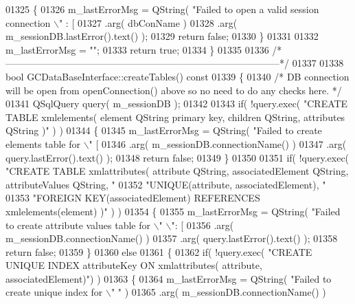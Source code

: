 \begin{DoxyCode}
{{{{{{{{{{{{{{{{{{{{{{{{{{{{{{{{{{{{{{{{{{{{{{{{{{01325   \{
01326     m\_lastErrorMsg = QString( \textcolor{stringliteral}{"Failed to open a valid session connection \(\backslash\)"%
      : [%
01327         .arg( dbConName )
01328         .arg( m\_sessionDB.lastError().text() );
01329     \textcolor{keywordflow}{return} \textcolor{keyword}{false};
01330   \}
01331 
01332   m\_lastErrorMsg = \textcolor{stringliteral}{""};
01333   \textcolor{keywordflow}{return} \textcolor{keyword}{true};
01334 \}
01335 
01336 \textcolor{comment}{/*
      --------------------------------------------------------------------------------------*/}
01337 
01338 \textcolor{keywordtype}{bool} GCDataBaseInterface::createTables()\textcolor{keyword}{ const}
01339 \textcolor{keyword}{}\{
01340   \textcolor{comment}{/* DB connection will be open from openConnection() above so no need to do
       any checks here. */}
01341   QSqlQuery query( m\_sessionDB );
01342 
01343   \textcolor{keywordflow}{if}( !query.exec( \textcolor{stringliteral}{"CREATE TABLE xmlelements( element QString primary key,
       children QString, attributes QString )"} ) )
01344   \{
01345     m\_lastErrorMsg = QString( \textcolor{stringliteral}{"Failed to create elements table for \(\backslash\)"%
       [%
01346         .arg( m\_sessionDB.connectionName() )
01347         .arg( query.lastError().text() );
01348     \textcolor{keywordflow}{return} \textcolor{keyword}{false};
01349   \}
01350 
01351   \textcolor{keywordflow}{if}( !query.exec( \textcolor{stringliteral}{"CREATE TABLE xmlattributes( attribute QString,
       associatedElement QString, attributeValues QString, "}
01352                    \textcolor{stringliteral}{"UNIQUE(attribute, associatedElement), "}
01353                    \textcolor{stringliteral}{"FOREIGN KEY(associatedElement) REFERENCES
       xmlelements(element) )"} ) )
01354   \{
01355     m\_lastErrorMsg = QString( \textcolor{stringliteral}{"Failed to create attribute values table for \(\backslash\)"%
      \(\backslash\)": [%
01356         .arg( m\_sessionDB.connectionName() )
01357         .arg( query.lastError().text() );
01358     \textcolor{keywordflow}{return} \textcolor{keyword}{false};
01359   \}
01360   \textcolor{keywordflow}{else}
01361   \{
01362     \textcolor{keywordflow}{if}( !query.exec( \textcolor{stringliteral}{"CREATE UNIQUE INDEX attributeKey ON xmlattributes(
       attribute, associatedElement)"}) )
01363     \{
01364       m\_lastErrorMsg = QString( \textcolor{stringliteral}{"Failed to create unique index for \(\backslash\)"%
      "} )
01365           .arg( m\_sessionDB.connectionName() )
}}}}}}}}}}}}}}}}}}}}}}}}}}}}}}}}}}}}}}}}}}}}}}}}}}}}}
\end{DoxyCode}
